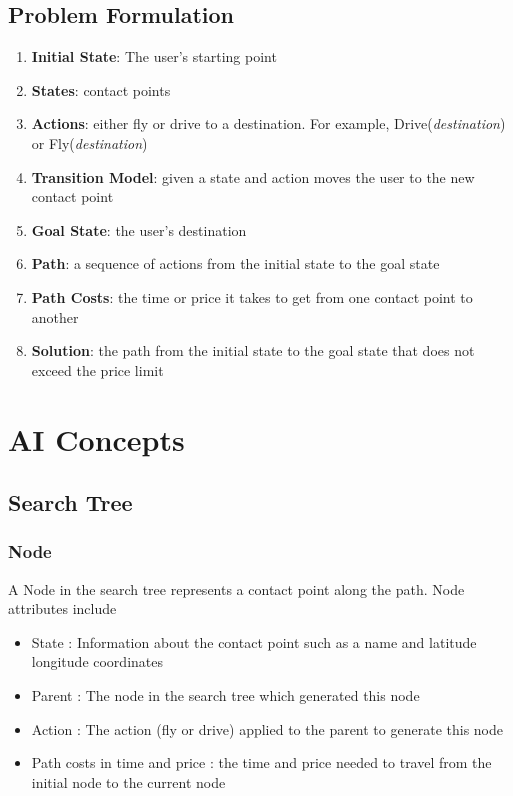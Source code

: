 \documentclass[11pt]{article}
\begin{document}
\subsection{Problem Formulation}
\begin{enumerate}
\item \textbf{Initial State}: The user's starting point
\item \textbf{States}: contact points
\item	 \textbf{Actions}: either fly or drive to a destination. For example, Drive(\emph{destination}) or Fly(\emph{destination})
\item \textbf{Transition Model}: given a state and action moves the user to the new contact point
\item \textbf{Goal State}: the user's destination
\item \textbf{Path}: a sequence of actions from the initial state to the goal state
\item \textbf{Path Costs}: the time or price it takes to get from one contact point to another %
\item \textbf{Solution}: the path from the initial state to the goal state that does not exceed the price limit
\end{enumerate}

\section{AI Concepts}
\subsection{Search Tree}

\subsubsection{Node} A Node in the search tree represents a contact point along the path. Node attributes include
\begin{itemize}
\item State : Information about the contact point such as a name and latitude longitude coordinates
\item Parent : The node in the search tree which generated this node
\item Action : The action (fly or drive) applied to the parent to generate this node
\item Path costs in time and price : the time and price needed to travel from the initial node to the current node
\end{itemize}
\end{document}
